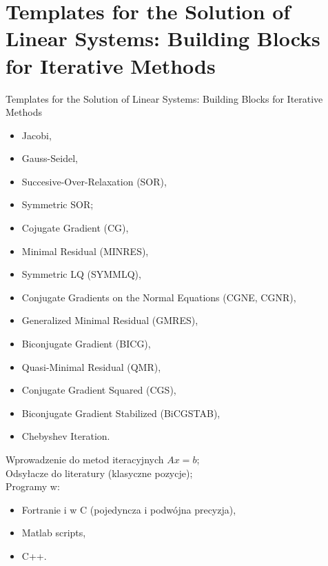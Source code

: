 \section{Templates for the Solution of Linear Systems: Building Blocks for Iterative Methods}
	\begin{frame}[allowframebreaks]{Templates for the Solution of Linear Systems: Building Blocks for Iterative Methods}
		\begin{itemize}
			\item Jacobi,
			\item Gauss-Seidel,
			\item Succesive-Over-Relaxation (SOR),
			\item Symmetric SOR;
			\item Cojugate Gradient (CG),
			\item Minimal Residual (MINRES),
			\item Symmetric LQ (SYMMLQ),
			\item Conjugate Gradients on the Normal Equations (CGNE, CGNR),
			\item Generalized Minimal Residual (GMRES),
			\item Biconjugate Gradient (BICG),
			\item Quasi-Minimal Residual (QMR),
			\item Conjugate Gradient Squared (CGS),
			\item Biconjugate Gradient Stabilized (BiCGSTAB),
			\item Chebyshev Iteration.
		\end{itemize}
		Wprowadzenie do metod iteracyjnych $Ax = b$; \\
		Odsyłacze do literatury (klasyczne pozycje); \\
		Programy w:
		\begin{itemize}
			\item Fortranie i w C (pojedyncza i podwójna precyzja),
			\item Matlab scripts,
			\item C++.
		\end{itemize}
	\end{frame}